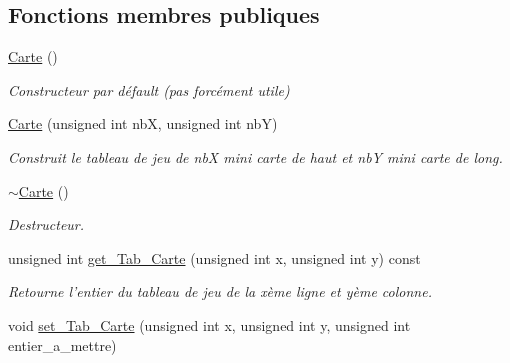 \subsection*{Fonctions membres publiques}
\begin{DoxyCompactItemize}
\item 
\hypertarget{classCarte_a06daaca86c31c80f8308f4a81d46dc9b}{\hyperlink{classCarte_a06daaca86c31c80f8308f4a81d46dc9b}{Carte} ()}\label{classCarte_a06daaca86c31c80f8308f4a81d46dc9b}

\begin{DoxyCompactList}\small\item\em Constructeur par défault (pas forcément utile) \end{DoxyCompactList}\item 
\hypertarget{classCarte_a33cce3c3550977f57b0ceeb338752d58}{\hyperlink{classCarte_a33cce3c3550977f57b0ceeb338752d58}{Carte} (unsigned int nb\+X, unsigned int nb\+Y)}\label{classCarte_a33cce3c3550977f57b0ceeb338752d58}

\begin{DoxyCompactList}\small\item\em Construit le tableau de jeu de nb\+X mini carte de haut et nb\+Y mini carte de long. \end{DoxyCompactList}\item 
\hypertarget{classCarte_a63300ff55c58b5d5b1674a3fc8f25910}{\hyperlink{classCarte_a63300ff55c58b5d5b1674a3fc8f25910}{$\sim$\+Carte} ()}\label{classCarte_a63300ff55c58b5d5b1674a3fc8f25910}

\begin{DoxyCompactList}\small\item\em Destructeur. \end{DoxyCompactList}\item 
\hypertarget{classCarte_a2d0d0c093f0baf8b3e3b4602821d9e0e}{unsigned int \hyperlink{classCarte_a2d0d0c093f0baf8b3e3b4602821d9e0e}{get\+\_\+\+Tab\+\_\+\+Carte} (unsigned int x, unsigned int y) const }\label{classCarte_a2d0d0c093f0baf8b3e3b4602821d9e0e}

\begin{DoxyCompactList}\small\item\em Retourne l'entier du tableau de jeu de la xème ligne et yème colonne. \end{DoxyCompactList}\item 
\hypertarget{classCarte_a5e1d007b47aac9993874dd83dad04c6a}{void \hyperlink{classCarte_a5e1d007b47aac9993874dd83dad04c6a}{set\+\_\+\+Tab\+\_\+\+Carte} (unsigned int x, unsigned int y, unsigned int entier\+\_\+a\+\_\+mettre)}\label{classCarte_a5e1d007b47aac9993874dd83dad04c6a}


\end{DoxyCompactItemize}
